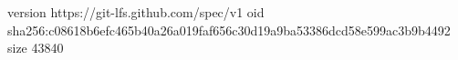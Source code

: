 version https://git-lfs.github.com/spec/v1
oid sha256:c08618b6efc465b40a26a019faf656c30d19a9ba53386dcd58e599ac3b9b4492
size 43840
